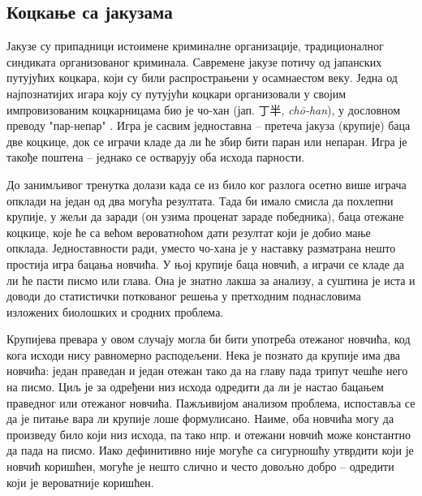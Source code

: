 \documentclass[12pt,oneside]{memoir}
\begin{document}
\begin{CJK}{UTF8}{ipxm}
\section{Коцкање са јакузама}
Јакузе су припадници истоимене криминалне организације, традиционалног синдиката организованог криминала. Савремене јакузе потичу од јапанских путујућих коцкара, који су били распрострањени у осамнаестом веку. Једна од најпознатијих игара коју су путујући коцкари организовали у својим импровизованим коцкарницама био је чо-хан (јап. 丁半, \textit{chō-han}), у дословном преводу "пар-непар" \cite{souter2013}. Игра је сасвим једноставна -- претеча јакуза (крупије) баца две коцкице, док се играчи кладе да ли ће збир бити паран или непаран. Игра је такође поштена -- једнако се остварују оба исхода парности.

До занимљивог тренутка долази када се из било ког разлога осетно више играча опклади на један од два могућа резултата. Тада би имало смисла да похлепни крупије, у жељи да заради (он узима проценат зараде победника), баца отежане коцкице, које ће са већом вероватноћом дати резултат који је добио мање опклада. Једноставности ради, уместо чо-хана је у наставку разматрана нешто простија игра бацања новчића. У њој крупије баца новчић, а играчи се кладе да ли ће пасти писмо или глава. Она је знатно лакша за анализу, а суштина је иста и доводи до статистички поткованог решења у претходним поднасловима изложених биолошких и сродних проблема.

Крупијева превара у овом случају могла би бити употреба отежаног новчића, код кога исходи нису равномерно расподељени. Нека је познато да крупије има два новчића: један праведан и један отежан тако да на главу пада трипут чешће него на писмо. Циљ је за одређени низ исхода одредити да ли је настао бацањем праведног или отежаног новчића. Пажљивијом анализом проблема, испоставља се да је питање вара ли крупије лоше формулисано. Наиме, оба новчића могу да произведу било који низ исхода, па тако нпр. и отежани новчић може константно да пада на писмо. Иако дефинитивно није могуће са сигурношћу утврдити који је новчић коришћен, могуће је нешто слично и често довољно добро -- одредити који је вероватније коришћен.


\end{CJK}
\end{document}

